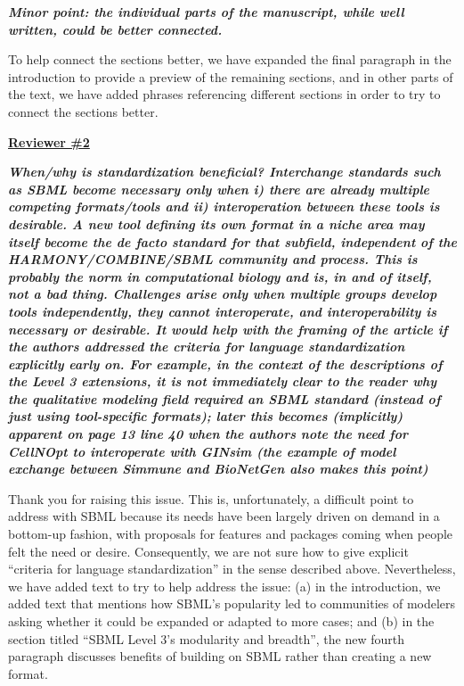 \documentclass[11pt]{mhletter}
\begin{document}
\textbf{\textit{Minor point: the individual parts of the manuscript, while well written, could be better connected.}}

To help connect the sections better, we have expanded the final paragraph in the introduction to provide a preview of the remaining sections, and in other parts of the text, we have added phrases referencing different sections in order to try to connect the sections better.


\clearpage
\textbf{\underline{Reviewer \#2}}

\textbf{\textit{When/why is standardization beneficial? Interchange standards such as SBML become necessary only when i) there are already multiple competing formats/tools and ii) interoperation between these tools is desirable. A new tool defining its own format in a niche area may itself become the de facto standard for that subfield, independent of the HARMONY/COMBINE/SBML community and process. This is probably the norm in computational biology and is, in and of itself, not a bad thing. Challenges arise only when multiple groups develop tools independently, they cannot interoperate, and interoperability is necessary or desirable. It would help with the framing of the article if the authors addressed the criteria for language standardization explicitly early on. For example, in the context of the descriptions of the Level 3 extensions, it is not immediately clear to the reader why the qualitative modeling field required an SBML standard (instead of just using tool-specific formats); later this becomes (implicitly) apparent on page 13 line 40 when the authors note the need for CellNOpt to interoperate with GINsim (the example of model exchange between Simmune and BioNetGen also makes this point)}}

Thank you for raising this issue.  This is, unfortunately, a difficult point to address with SBML because its needs have been largely driven on demand in a bottom-up fashion, with proposals for features and packages coming when people felt the need or desire.  Consequently, we are not sure how to give explicit ``criteria for language standardization'' in the sense described above.  Nevertheless, we have added text to try to help address the issue: (a) in the introduction, we added text that mentions how SBML's popularity led to communities of modelers asking whether it could be expanded or adapted to more cases; and (b) in the section titled ``SBML Level 3's modularity and breadth'', the new fourth paragraph discusses benefits of building on SBML rather than creating a new format.
\end{document}
